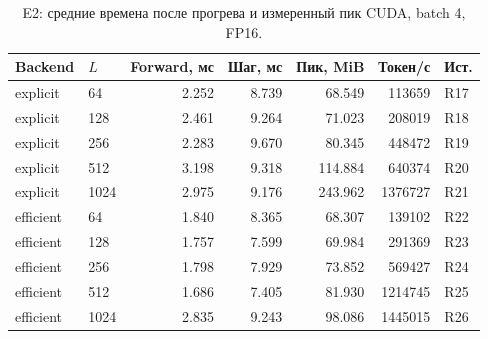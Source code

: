 \begin{table}[H]\centering\footnotesize
\setlength{\tabcolsep}{4pt}
\caption{E2: средние времена после прогрева и измеренный пик CUDA, batch 4, FP16.}\label{tab:e2}
\begin{tabular}{llrrrrl}
\toprule
Backend & $L$ & Forward, мс & Шаг, мс & Пик, MiB & Токен/с & Ист. \\
\midrule
explicit & 64 & 2.252 & 8.739 & 68.549 & 113659 & R17 \\
explicit & 128 & 2.461 & 9.264 & 71.023 & 208019 & R18 \\
explicit & 256 & 2.283 & 9.670 & 80.345 & 448472 & R19 \\
explicit & 512 & 3.198 & 9.318 & 114.884 & 640374 & R20 \\
explicit & 1024 & 2.975 & 9.176 & 243.962 & 1376727 & R21 \\
efficient & 64 & 1.840 & 8.365 & 68.307 & 139102 & R22 \\
efficient & 128 & 1.757 & 7.599 & 69.984 & 291369 & R23 \\
efficient & 256 & 1.798 & 7.929 & 73.852 & 569427 & R24 \\
efficient & 512 & 1.686 & 7.405 & 81.930 & 1214745 & R25 \\
efficient & 1024 & 2.835 & 9.243 & 98.086 & 1445015 & R26 \\
\bottomrule
\end{tabular}
\end{table}
